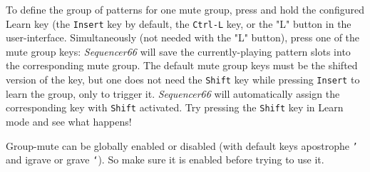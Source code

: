 

   To define the group of patterns for one mute group, press and hold the
   configured Learn key (the \texttt{Insert} key by default,
   the \texttt{Ctrl-L} key, or the "L" button in the user-interface.
   Simultaneously (not needed with the "L" button),
   press one of the mute group keys: \textsl{Sequencer66}
   will save the currently-playing pattern slots into the corresponding mute
   group.
   The default mute group keys must be the shifted version of the key,
   but one does not need the \texttt{Shift} key while pressing
   \texttt{Insert} to learn the group, only to trigger it.
   \textsl{Sequencer66} will automatically assign the corresponding key with
   \texttt{Shift} activated.  Try pressing the \texttt{Shift} key in Learn mode
   and see what happens!


   Group-mute can be globally enabled or disabled (with default keys apostrophe
   \texttt{'}   and igrave or grave \texttt{`}).
   So make sure it is enabled before trying to use it.

%

